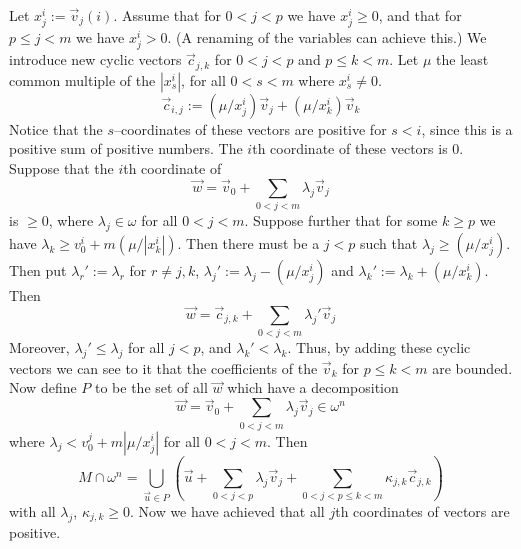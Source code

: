Let $x^i_j := \vec{v}_j(i)$. Assume that for $0 < j < p$ we have 
$x^i_j \geq 0$, and that for $p \leq j < m$ we have $x^i_j > 0$. 
(A renaming of the variables can achieve this.) We introduce new 
cyclic vectors $\vec{c}_{j,k}$ for $0 < j < p$ and $p \leq k < m$. 
Let $\mu$ the least common multiple of the $|x^i_s|$, for all 
$0 < s < m$ where $x^i_s \neq 0$. 
\begin{equation}
\vec{c}_{i,j} := (\mu/x^i_j) \vec{v}_j + (\mu/x^i_k)\vec{v}_k
\end{equation}
Notice that the $s$--coordinates of these vectors are positive 
for $s < i$, since this is a positive sum of positive numbers. 
The $i$th coordinate of these vectors is 0. Suppose that the 
$i$th coordinate of 
\begin{equation}
\vec{w} = \vec{v}_0 + \sum_{0 < j < m} \lambda_j \vec{v}_j
\end{equation}
is $\geq 0$, where $\lambda_j \in \omega$ for all $0 < j < m$. Suppose 
further that for some $k \geq p$ we have 
$\lambda_k \geq v^i_0 + m(\mu/|x^i_k|)$. 
Then there must be a $j < p$ such that $\lambda_j \geq 
(\mu/x^i_j)$. Then put $\lambda_r' := \lambda_r$ for 
$r \neq j,k$, $\lambda_j' := \lambda_j - (\mu/x^i_j)$ and 
$\lambda_k' := \lambda_k + (\mu/x^i_k)$. Then
\begin{equation}
\vec{w} = \vec{c}_{j,k} + \sum_{0 < j < m} \lambda_j' \vec{v}_j
\end{equation}
Moreover, $\lambda_j' \leq \lambda_j$ for all $j < p$, and 
$\lambda_k' < \lambda_k$. Thus, by adding these cyclic vectors 
we can see to it that the coefficients of the $\vec{v}_k$ 
for $p \leq k < m$ are bounded. Now define $P$ to be the set of 
all $\vec{w}$ which have a decomposition
\begin{equation}
\vec{w} = \vec{v}_0 + \sum_{0 < j < m} \lambda_j \vec{v}_j \in \omega^n
\end{equation}
where $\lambda_j < v^j_0 + m |\mu/x^i_j|$ for all $0 < j < m$.
Then 
\begin{equation}
M \cap \omega^n = \bigcup_{\vec{u} \in P} \left(\vec{u} + 
	\sum_{0 < j < p} \lambda_j \vec{v}_j + 
	\sum_{0 < j < p \leq k < m} \kappa_{j,k} \vec{c}_{j,k}\right)
\end{equation}
with all $\lambda_j$, $\kappa_{j,k} \geq 0$. Now we have achieved that 
all $j$th coordinates of vectors are positive. 
\proofend

